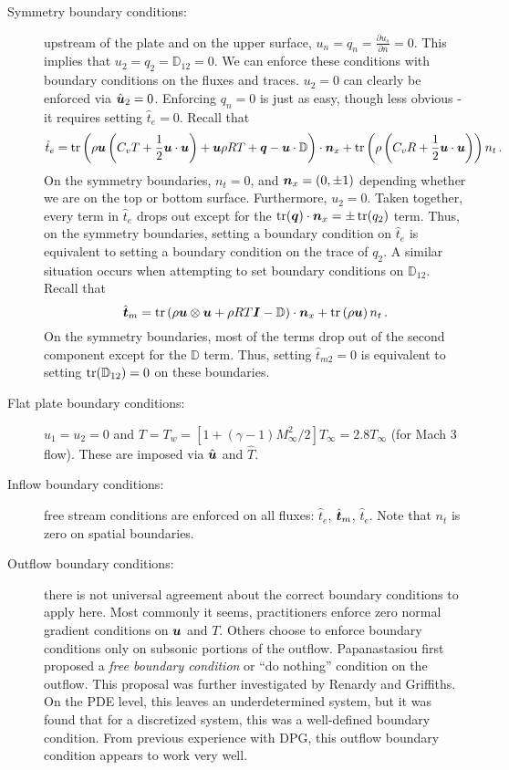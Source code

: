 \documentclass[Proposal.tex]{subfiles}
\begin{document}
\begin{description}
	\item[Symmetry boundary conditions:] upstream of the plate and on the upper surface, $u_n=q_n=\frac{\partial u_s}{\partial n}=0$.
	This implies that $u_2=q_2=\mathbb{D}_{12}=0$. 
	We can enforce these conditions with boundary conditions on the fluxes and traces. $u_2=0$ can clearly be enforced via $\hat{\boldsymbol u}_2=0$.
	Enforcing $q_n=0$ is just as easy, though less obvious - it requires setting $\hat t_e=0$.
	Recall that 
	\begin{equation*}
	\hat t_e=\operatorname*{tr}\left( \rho\boldsymbol u\left( C_v T+\frac{1}{2}\boldsymbol u\cdot\boldsymbol u \right)+\boldsymbol u\rho RT+\boldsymbol q-\boldsymbol u\cdot\mathbb{D} \right)\cdot\boldsymbol n_x
	+\operatorname*{tr}\left( \rho\left( C_v R+\frac{1}{2}\boldsymbol u\cdot\boldsymbol u \right) \right)n_t\,.
	\end{equation*}
	On the symmetry boundaries, $n_t=0$, and $\boldsymbol n_x=(0,\pm1)$ depending whether we are on the top or bottom surface. 
	Furthermore, $u_2=0$. Taken together, every term in $\hat t_e$ drops out except for the $\operatorname*{tr}(\boldsymbol q)\cdot\boldsymbol n_x=\pm\operatorname*{tr}(q_2)$ term.
	Thus, on the symmetry boundaries, setting a boundary condition on $\hat t_e$ is equivalent to setting a boundary condition on the trace of $q_2$.
	A similar situation occurs when attempting to set boundary conditions on $\mathbb{D}_{12}$. Recall that
	\begin{equation*}
	\hat{\boldsymbol t}_m=\operatorname*{tr}\left( \rho\boldsymbol u\otimes\boldsymbol u+\rho RT\boldsymbol I-\mathbb{D} \right)\cdot\boldsymbol n_x
	+\operatorname*{tr}\left( \rho\boldsymbol u \right) n_t\,.
	\end{equation*}
	On the symmetry boundaries, most of the terms drop out of the second component except for the $\mathbb{D}$ term.
	Thus, setting $\hat t_{m2}=0$ is equivalent to setting $\operatorname*{tr}(\mathbb{D}_{12})=0$ on these boundaries.
	\item[Flat plate boundary conditions:] $u_1=u_2=0$ and $T=T_w=[1+(\gamma-1)M_\infty^2/2]T_\infty=2.8T_\infty$ (for Mach 3 flow).
	These are imposed via $\hat{\boldsymbol u}$ and $\hat T$.
	\item[Inflow boundary conditions:] free stream conditions are enforced on all fluxes: $\hat t_e$, $\hat{\boldsymbol t}_m$, $\hat t_e$. 
	Note that $n_t$ is zero on spatial boundaries.
	\item[Outflow boundary conditions:] there is not universal agreement about the correct boundary conditions to apply here.
	Most commonly it seems, practitioners enforce zero normal gradient conditions on $\boldsymbol u$ and $T$. 
	Others choose to enforce boundary conditions only on subsonic portions of the outflow\cite{DemkowiczCNS1990}.
	Papanastasiou first proposed a \emph{free boundary condition} or ``do nothing'' condition on the outflow.
	This proposal was further investigated by Renardy\cite{Renardy1997} and Griffiths\cite{Griffiths1997}.
	On the PDE level, this leaves an underdetermined system, but it was found that for a discretized system, this was a well-defined boundary condition.
	From previous experience with DPG, this outflow boundary condition appears to work very well.
\end{description}
\end{document}
